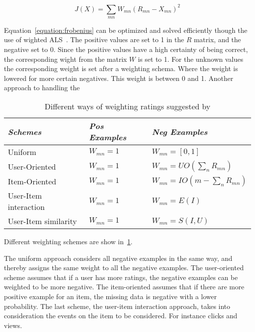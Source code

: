     \begin{equation}
        J(X) = \sum_{mn} W_{mn}(R_{mn} - X_{mn})^2
        \label{equation:frobenius}
    \end{equation}

    Equation~\ref{equation:frobenius} can be optimized and solved efficiently
    though the use of wighted ALS~\citep{Koren2009}.  The positive values are set
    to 1 in the $R$ matrix, and the negative set to 0.
    Since the positive values have a high certainty of being correct, the
    corresponding wight from the matrix $W$ is set to 1.  For the unknown values
    the corresponding weight is set after a weighting schema.  Where the weight is
    lowered for more certain negatives.  This weight is between 0 and 1.  Another
    approach to handling the

    \begin{table}[H]
        \centering
        \begin{tabular}{l|l|l}
          \emph{Schemes}      & \emph{Pos Examples} & \emph{Neg Examples} \\ \hline
          Uniform               & $W_{mn} = 1$ & $W_{mn} = [0,1]$ \\ \hline
          User-Oriented         & $W_{mn} = 1$ & $W_{mn} = UO(\sum_{n} R_{mn})$ \\ \hline
          Item-Oriented         & $W_{mn} = 1$ & $W_{mn} = IO(m - \sum_{n} R_{mn})$ \\ \hline
          User-Item interaction & $W_{mn} = 1$ & $W_{mn} = E(I)$  \\ \hline
          User-Item similarity & $W_{mn} = 1$ & $W_{mn} = S(I,U)$  \\
        \end{tabular}
        \caption[Weighting Schemes]{Different ways of weighting ratings suggested by \cite{pan2008}}
        \label{table:WeightingSchemes}
    \end{table}

    Different weighting schemes are show in~\ref{table:WeightingSchemes}.

    The uniform approach considers all negative examples in the same way, and
    thereby assigns the same weight to all the negative examples.  The
    user-oriented scheme assumes that if a user has more ratings, the negative
    examples can be weighted to be more negative.  The item-oriented assumes that
    if there are more positive example for an item, the missing data is negative
    with a lower probability.  The last scheme, the user-item interaction
    approach, takes into consideration the events on the item to be considered.
    For instance clicks and views.

